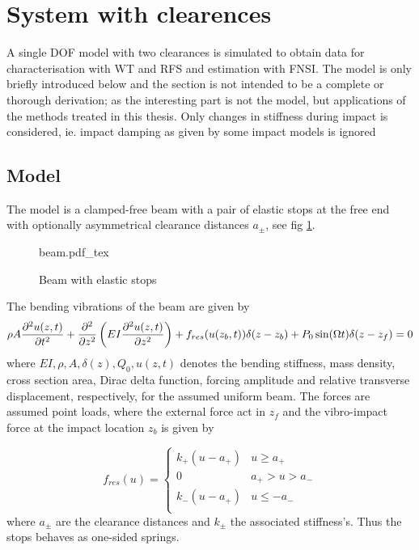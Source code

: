 \FloatBarrier
\section{System with clearences}
\label{sec:syst-with-clear}

A single DOF model with two clearances is simulated to obtain data for
characterisation with WT and RFS and estimation with FNSI. The model is only
briefly introduced below and the section is not intended to be a complete or
thorough derivation; as the interesting part is not the model, but applications
of the methods treated in this thesis.
Only changes in stiffness during impact is considered, ie. impact damping as
given by some impact models is ignored

\subsection{Model}

The model is a clamped-free beam with a pair of elastic stops at the free end
with optionally asymmetrical clearance distances $a_\pm$, see fig
\ref{fig:clear_schematic}.


\begin{figure}[!ht]
  \centering
  \centering
  \def\svgwidth{10cm}
  {beam.pdf_tex}
  \caption{Beam with elastic stops}
  \label{fig:clear_schematic}
\end{figure}


The bending vibrations of the beam are given by
\begin{equation}
  \label{eq:clear_EOM}
  \rho A \frac{\partial^2 u(z,t)}{\partial t^2} + \frac{\partial^2}{\partial z^2}
  \left( EI \frac{\partial^2 u(z,t)}{\partial z^2}  \right) +
  f_{res}(u(z_b,t)) \delta (z-z_b) +
  P_0 \sin(\Omega t) \delta(z-z_f)= 0
\end{equation}
where $EI, \rho, A, \delta(z), Q_0, u(z,t)$ denotes the bending stiffness, mass
density, cross section area, Dirac delta function, forcing amplitude and
relative transverse displacement, respectively, for the assumed uniform beam.
The forces are assumed point loads, where the external force act in $z_f$ and the
vibro-impact force at the impact location $z_b$ is given by

\begin{equation}
  \label{eq:clear_vibro_force}
  f_{res}(u) =
  \begin{cases}
    k_+(u - a_+) & u \geq a_+ \\
    0 &  a_+ > u > a_- \\
    k_-(u - a_+) & u \leq - a_- \\
  \end{cases}
\end{equation}
where $a_\pm$ are the clearance distances and $k_\pm$ the associated
stiffness's. Thus the stops behaves as one-sided springs.

